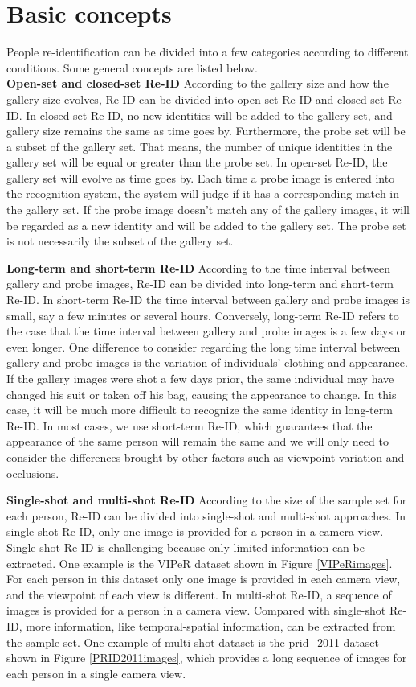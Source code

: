\section{Basic concepts}
People re-identification can be divided into a few categories according to different conditions. Some general concepts are listed below.\\
\indent \textbf{Open-set and closed-set Re-ID} \cite{REIDsurvey} According to the gallery size and how the gallery size evolves, Re-ID can be divided into open-set Re-ID and closed-set Re-ID. In closed-set Re-ID, no new identities will be added to the gallery set, and gallery size remains the same as time goes by. Furthermore, the probe set will be a subset of the gallery set. That means, the number of unique identities in the gallery set will be equal or greater than the probe set. In open-set Re-ID, the gallery set will evolve as time goes by. Each time a probe image is entered into the recognition system, the system will judge if it has a corresponding match in the gallery set. If the probe image doesn't match any of the gallery images, it will be regarded as a new identity and will be added to the gallery set. The probe set is not necessarily the subset of the gallery set. 

\textbf{Long-term and short-term Re-ID} According to the time interval between gallery and probe images, Re-ID can be divided into long-term and short-term Re-ID.  In short-term Re-ID the time interval between gallery and probe images is small, say a few minutes or several hours. Conversely, long-term Re-ID refers to the case that the time interval between gallery and probe images is a few days or even longer. One difference to consider regarding the long time interval between gallery and probe images is the variation of individuals' clothing and appearance. If the gallery images were shot a few days prior, the same individual may have changed his suit or taken off his bag, causing the appearance to change. In this case, it will be much more difficult to recognize the same identity in long-term Re-ID. In most cases, we use short-term Re-ID, which guarantees that the appearance of the same person will remain the same and we will only need to consider the differences brought by other factors such as viewpoint variation and occlusions.


\textbf{Single-shot and multi-shot Re-ID} According to the size of the sample set for each person, Re-ID can be divided into single-shot and multi-shot approaches. In single-shot Re-ID, only one image is provided for a person in a camera view. Single-shot Re-ID is challenging because only limited information can be extracted. One example is the VIPeR dataset shown in Figure \ref{VIPeRimages}. For each person in this dataset only one image is provided in each camera view, and the viewpoint of each view is different. In multi-shot Re-ID, a sequence of images is provided for a person in a camera view. Compared with single-shot Re-ID, more information, like temporal-spatial information, can be extracted from the sample set. One example of multi-shot dataset is the prid\_2011 dataset shown in Figure \ref{PRID2011images}, which provides a long sequence of images for each person in a single camera view.

